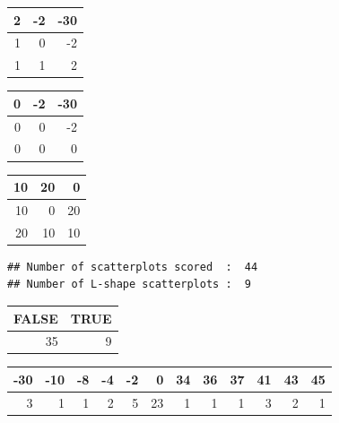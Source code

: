 \documentclass[a4paper,10pt]{article}\usepackage[]{graphicx}\usepackage[]{xcolor}
\makeatletter
\newenvironment{kframe}{%
 \def\at@end@of@kframe{}%
 \ifinner\ifhmode%
  \def\at@end@of@kframe{\end{minipage}}%
  \begin{minipage}{\columnwidth}%
 \fi\fi%
 \def\FrameCommand##1{\hskip\@totalleftmargin \hskip-\fboxsep
 \colorbox{shadecolor}{##1}\hskip-\fboxsep
     \hskip-\linewidth \hskip-\@totalleftmargin \hskip\columnwidth}%
 \MakeFramed {\advance\hsize-\width
   \@totalleftmargin\z@ \linewidth\hsize
   \@setminipage}}%
 {\par\unskip\endMakeFramed%
 \at@end@of@kframe}
\newenvironment{knitrout}{}{} %
\makeatother
\begin{document}
\begin{knitrout}
\color{fgcolor}


\begin{tabular}{r|r|r}
\hline
2 & -2 & -30\\
\hline
1 & 0 & -2\\
\hline
1 & 1 & 2\\
\hline
\end{tabular}


\begin{tabular}{r|r|r}
\hline
0 & -2 & -30\\
\hline
0 & 0 & -2\\
\hline
0 & 0 & 0\\
\hline
\end{tabular}


\begin{tabular}{r|r|r}
\hline
10 & 20 & 0\\
\hline
10 & 0 & 20\\
\hline
20 & 10 & 10\\
\hline
\end{tabular}\begin{kframe}\begin{verbatim}
## Number of scatterplots scored  :  44
## Number of L-shape scatterplots :  9
\end{verbatim}
\end{kframe}


\begin{tabular}{r|r}
\hline
FALSE & TRUE\\
\hline
35 & 9\\
\hline
\end{tabular}


\begin{tabular}{r|r|r|r|r|r|r|r|r|r|r|r}
\hline
-30 & -10 & -8 & -4 & -2 & 0 & 34 & 36 & 37 & 41 & 43 & 45\\
\hline
3 & 1 & 1 & 2 & 5 & 23 & 1 & 1 & 1 & 3 & 2 & 1\\
\hline
\end{tabular}
\end{knitrout}
\end{document}
